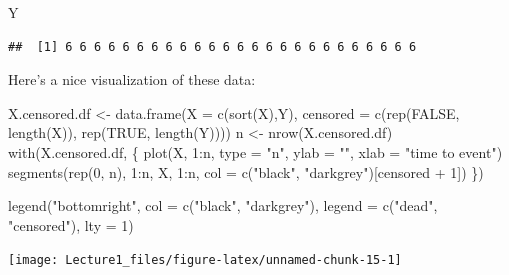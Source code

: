 \documentclass[]{tufte-handout}
\newenvironment{Shaded}{}{}
\newcommand{\AttributeTok}[1]{\textcolor[rgb]{0.49,0.56,0.16}{#1}}
\newcommand{\ConstantTok}[1]{\textcolor[rgb]{0.53,0.00,0.00}{#1}}
\newcommand{\DecValTok}[1]{\textcolor[rgb]{0.25,0.63,0.44}{#1}}
\newcommand{\FunctionTok}[1]{\textcolor[rgb]{0.02,0.16,0.49}{#1}}
\newcommand{\NormalTok}[1]{#1}
\newcommand{\OtherTok}[1]{\textcolor[rgb]{0.00,0.44,0.13}{#1}}
\newcommand{\SpecialCharTok}[1]{\textcolor[rgb]{0.25,0.44,0.63}{#1}}
\newcommand{\StringTok}[1]{\textcolor[rgb]{0.25,0.44,0.63}{#1}}
\begin{document}
\begin{Shaded}
\begin{Highlighting}[]
\NormalTok{Y}
\end{Highlighting}
\end{Shaded}

\begin{verbatim}
##  [1] 6 6 6 6 6 6 6 6 6 6 6 6 6 6 6 6 6 6 6 6 6 6 6 6 6
\end{verbatim}

Here's a nice visualization of these data:

\begin{Shaded}
\begin{Highlighting}[]
\NormalTok{X.censored.df }\OtherTok{\textless{}{-}} \FunctionTok{data.frame}\NormalTok{(}\AttributeTok{X =} \FunctionTok{c}\NormalTok{(}\FunctionTok{sort}\NormalTok{(X),Y), }
                           \AttributeTok{censored =} \FunctionTok{c}\NormalTok{(}\FunctionTok{rep}\NormalTok{(}\ConstantTok{FALSE}\NormalTok{, }\FunctionTok{length}\NormalTok{(X)), }
                                        \FunctionTok{rep}\NormalTok{(}\ConstantTok{TRUE}\NormalTok{, }\FunctionTok{length}\NormalTok{(Y))))}
\NormalTok{n }\OtherTok{\textless{}{-}} \FunctionTok{nrow}\NormalTok{(X.censored.df)}
\FunctionTok{with}\NormalTok{(X.censored.df, \{}
     \FunctionTok{plot}\NormalTok{(X, }\DecValTok{1}\SpecialCharTok{:}\NormalTok{n, }\AttributeTok{type =} \StringTok{"n"}\NormalTok{, }
          \AttributeTok{ylab =} \StringTok{""}\NormalTok{, }\AttributeTok{xlab =} \StringTok{"time to event"}\NormalTok{)}
     \FunctionTok{segments}\NormalTok{(}\FunctionTok{rep}\NormalTok{(}\DecValTok{0}\NormalTok{, n), }\DecValTok{1}\SpecialCharTok{:}\NormalTok{n, X, }\DecValTok{1}\SpecialCharTok{:}\NormalTok{n, }
              \AttributeTok{col =} \FunctionTok{c}\NormalTok{(}\StringTok{"black"}\NormalTok{, }\StringTok{"darkgrey"}\NormalTok{)[censored }\SpecialCharTok{+} \DecValTok{1}\NormalTok{])}
\NormalTok{    \})}

\FunctionTok{legend}\NormalTok{(}\StringTok{"bottomright"}\NormalTok{, }\AttributeTok{col =} \FunctionTok{c}\NormalTok{(}\StringTok{"black"}\NormalTok{, }\StringTok{"darkgrey"}\NormalTok{), }
       \AttributeTok{legend =} \FunctionTok{c}\NormalTok{(}\StringTok{"dead"}\NormalTok{, }\StringTok{"censored"}\NormalTok{), }\AttributeTok{lty =} \DecValTok{1}\NormalTok{)}
\end{Highlighting}
\end{Shaded}

\texttt{[image: Lecture1\_files/figure-latex/unnamed-chunk-15-1]}
\end{document}
